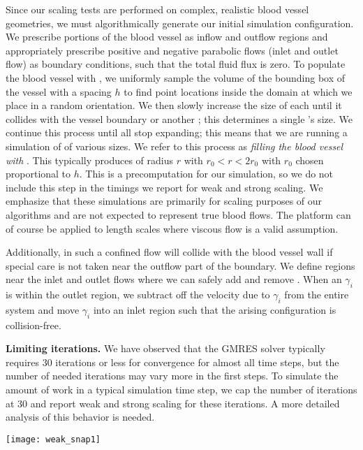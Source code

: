Since our scaling tests are performed on complex, realistic blood
vessel geometries, we must
algorithmically generate our initial simulation configuration.
We prescribe portions of the blood vessel as inflow and outflow regions and
appropriately prescribe positive and negative parabolic flows (inlet and outlet
flow) as boundary
conditions, such that the total fluid flux is zero.
To populate the blood vessel with \rbcs, we uniformly sample the volume of the 
bounding box of the vessel with a spacing $h$ to find point locations
inside the domain at which we place \rbcs in a random orientation.
We then slowly increase the size of each \rbc until it collides with the
vessel boundary or another \rbc; this determines a single \rbc's size.
We continue this process until all \rbcs stop expanding; this means that 
we are running a simulation of \rbcs of various sizes.
We refer to this process as \textit{filling the blood vessel with }\rbcs.
This typically produces \rbcs of radius $r$ with $r_0 < r < 2r_0$ with $r_0$ chosen proportional to $h$. 
This is a precomputation for our simulation, so we do not include this
step in the timings we report for weak and strong scaling.
We emphasize that these simulations are primarily for scaling purposes
of our algorithms and are not expected to represent true blood flows.
The platform can of course be applied to length scales where viscous
flow is a valid assumption.

Additionally, \rbcs in such a confined flow will collide with the
blood vessel wall
if special care is  not taken near the outflow part of the boundary.
We define regions near the inlet and outlet flows where we can safely add and
remove \rbcs.
When an \rbc $\gamma_i$ is within the outlet region, we subtract off the velocity due to
$\gamma_i$ from the entire system and move $\gamma_i$ into an inlet
region such that the arising \rbc
configuration is collision-free.

\textbf{Limiting  iterations. }
We have observed that the GMRES solver typically requires 30 iterations
or less for convergence for almost all time steps, but the number
of needed iterations may vary more in the first steps. 
To simulate the amount of work in a typical simulation time
step, we cap the number of \gmres iterations at 30 and report weak and strong
scaling for these iterations. A more detailed analysis of this behavior is needed.

\begin{figure*}[!bht]
\centering
  \texttt{[image: weak\_snap1]}
\end{figure*}


